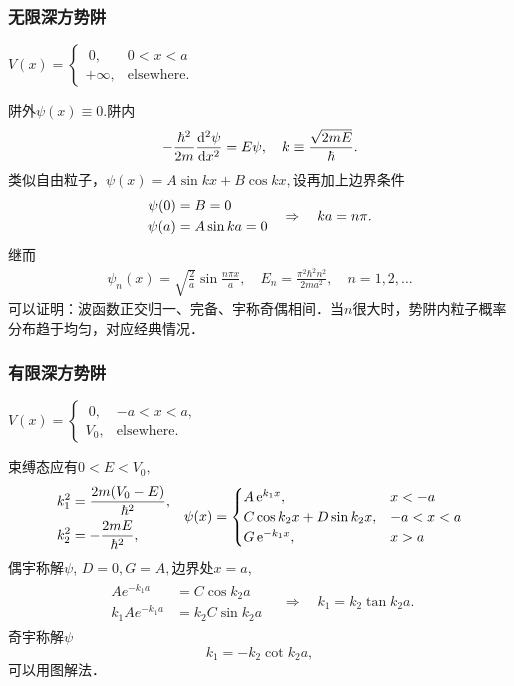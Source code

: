 \subsubsection*{无限深方势阱}
\begin{center}
	$V(x)=\begin{cases}
			~0,      & 0<x<a             \\
			+\infty, & \text{elsewhere.}
		\end{cases}$
\end{center}
阱外$\psi(x)\equiv 0.$阱内
\[
	-\frac{\hbar^2}{2m}\dv[2]{\psi}x=E\psi,\quad k\equiv\frac{\sqrt{2mE}}\hbar.
\]
类似自由粒子，$\psi(x)=A\sin kx+B\cos kx,$设再加上边界条件
\begin{align*}
	\begin{aligned}
		\psi(0)&=B=0 \\
		\psi(a)&=A\sin ka=0
	\end{aligned}
	\thus ka=n\pi.
\end{align*}
继而
\begin{align}
	\psi_n(x)=\sqrt{\frac2a}\sin\frac{n\pi x}a,\quad E_n=\frac{\pi^2\hbar^2n^2}{2ma^2},\quad n=1,2,\ldots
\end{align}
可以证明：波函数正交归一、完备、宇称奇偶相间．当$n$很大时，势阱内粒子概率分布趋于均匀，对应经典情况．

\subsubsection*{有限深方势阱}
\begin{center}
	$V(x)=\begin{cases}
			~0,  & -a<x<a,           \\
			V_0, & \text{elsewhere.}
		\end{cases}$
\end{center}
束缚态应有$0<E<V_0,$
\begin{align*}
	\begin{aligned}
		k_1^2 & =\frac{2m(V_0-E)}{\hbar^2}, \\
		k_2^2 & =-\frac{2mE}{\hbar^2},
	\end{aligned}\quad
	\psi(x)=\begin{cases}
		A\e{k_1x},             & x<-a   \\
		C\cos k_2x+D\sin k_2x, & -a<x<a \\
		G\e{-k_1x},            & x>a
	\end{cases}
\end{align*}
偶宇称解$\psi$, $D=0,G=A,$边界处$x=a$,
\begin{align*}
	\begin{aligned}
		Ae^{-k_1a}    & =C\cos k_2a    \\
		k_1Ae^{-k_1a} & =k_2C\sin k_2a
	\end{aligned}
	\quad\Rightarrow\quad
	k_1=k_2\tan k_2a.
\end{align*}
奇宇称解$\psi$
\[
	k_1=-k_2\cot k_2a,
\]
可以用图解法．

